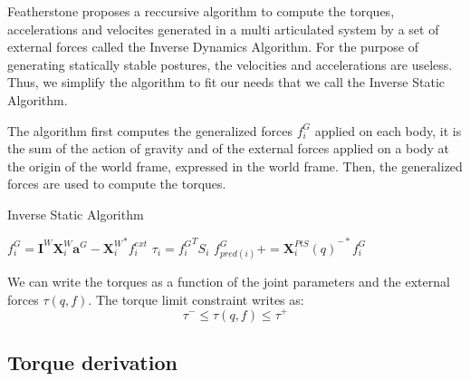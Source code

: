 Featherstone \cite{featherstone:book:2007} proposes a reccursive algorithm to compute the torques, accelerations and velocites generated in a multi articulated system by a set of external forces called the Inverse Dynamics Algorithm.
For the purpose of generating statically stable postures, the velocities and accelerations are useless.
Thus, we simplify the algorithm to fit our needs that we call the Inverse Static Algorithm.

The algorithm first computes the generalized forces $f^G_i$ applied on each body, it is the sum of the action of gravity and of the external forces applied on a body at the origin of the world frame, expressed in the world frame.
Then, the generalized forces are used to compute the torques.

\begin{algorithm}
  \caption{Inverse Static Algorithm}
  \label{IS}
\begin{algorithmic}
  \State $f^G_i = \mathbf{I}^W \mathbf{X}^W_i \mathbf{a}^G - {\mathbf{X}^W_i}^*f_i^{ext}$
  \EndFor
  \State $\tau_i = {f^G_i}^T S_i$
  \State $f^G_{pred(i)} += {\mathbf{X}^{PtS}_i(q)}^{-*} f^G_i$
  \EndIf
  \EndFor
\end{algorithmic}
\end{algorithm}

We can write the torques as a function of the joint parameters and the external forces $\tau(q,f)$.
The torque limit constraint writes as:
\begin{equation}
  \tau^- \leq \tau(q,f) \leq \tau^+
\end{equation}

\subsection{Torque derivation}

